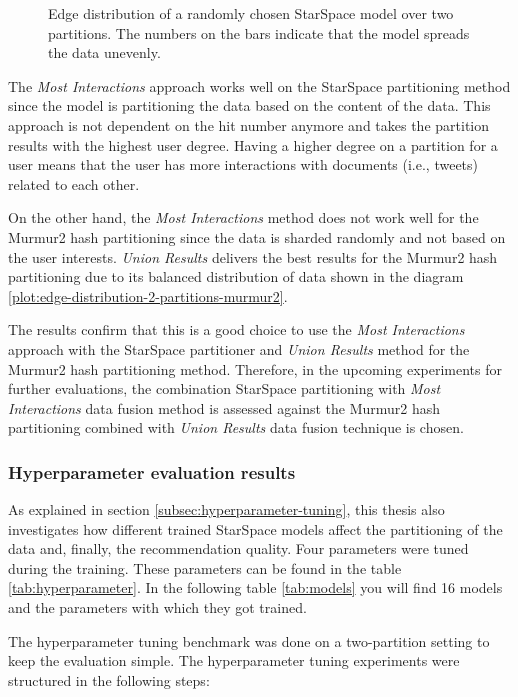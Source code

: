 \begin{figure}[!htb]
    \centering
    
    \caption{Edge distribution of a randomly chosen StarSpace model over two partitions. The numbers on the bars indicate that the model spreads the data unevenly.}
    \label{plot:star-space-edge-distribution-2-partitions}
\end{figure}


The \emph{Most Interactions} approach works well on the StarSpace partitioning method since the model is partitioning the data based on the content of the data. This approach is not dependent on the hit number anymore and takes the partition results with the highest user degree. Having a higher degree on a partition for a user means that the user has more interactions with documents (i.e., tweets) related to each other. 


On the other hand, the \emph{Most Interactions} method does not work well for the Murmur2 hash partitioning since the data is sharded randomly and not based on the user interests. \emph{Union Results} delivers the best results for the Murmur2 hash partitioning due to its balanced distribution of data shown in the diagram \ref{plot:edge-distribution-2-partitions-murmur2}. 


The results confirm that this is a good choice to use the \emph{Most Interactions} approach with the StarSpace partitioner and \emph{Union Results} method for the Murmur2 hash partitioning method. Therefore, in the upcoming experiments for further evaluations, the combination StarSpace partitioning with \emph{Most Interactions} data fusion method is assessed against the Murmur2 hash partitioning combined with \emph{Union Results} data fusion technique is chosen.


\subsubsection{Hyperparameter evaluation results}
\label{subsubsec:eval-hyperparameter}
As explained in section \ref{subsec:hyperparameter-tuning}, this thesis also investigates how different trained StarSpace models affect the partitioning of the data and, finally, the recommendation quality. Four parameters were tuned during the training. These parameters can be found in the table \ref{tab:hyperparameter}. In the following table \ref{tab:models} you will find 16 models and the parameters with which they got trained.


The hyperparameter tuning benchmark was done on a two-partition setting to keep the evaluation simple. The hyperparameter tuning experiments were structured in the following steps:

